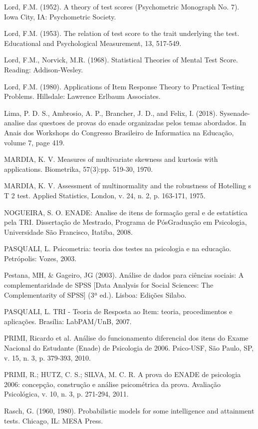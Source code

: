 \documentclass[12pt]{article}
\begin{document}
Lord, F.M. (1952). A theory of test scores (Psychometric Monograph No. 7). Iowa City, IA: Psychometric Society.

Lord, F.M. (1953). The relation of test score to the trait underlying the test. Educational and Psychological Measurement, 13, 517-549.

Lord, F.M., Norvick, M.R. (1968). Statistical Theories of Mental Test Score. Reading: Addison-Wesley.

Lord, F.M. (1980). Applications of Item Response Theory to Practical Testing Problems. Hillsdale: Lawrence Erlbaum Associates.

Lima, P. D. S., Ambrosio, A. P., Brancher, J. D., and Felix, I. (2018). Sysenade-analise
das questoes de provas do enade organizadas pelos temas abordados. In Anais dos
Workshops do Congresso Brasileiro de Informatica na Educação, volume 7, page 419.

MARDIA, K. V. Measures of multivariate skewness and kurtosis with applications. Biometrika, 57(3):pp. 519-30, 1970.

MARDIA, K. V. Assessment of multinormality and the robustness of Hotelling s T 2 test. Applied Statistics, London, v. 24, n. 2, p. 163-171, 1975.

NOGUEIRA, S. O. ENADE: Analise de itens de formação geral e de estatística pela TRI. Dissertação de Mestrado, Programa de PósGraduação em Psicologia, Universidade São Francisco, Itatiba, 2008.

PASQUALI, L. Psicometria: teoria dos testes na psicologia e na educação. Petrópolis: Vozes, 2003.

Pestana, MH, \& Gageiro, JG (2003). Análise de dados para ciências sociais: A complementaridade de SPSS [Data Analysis for Social Sciences: The Complementarity of SPSS] (3ª ed.). Lisboa: Edições Silabo.

PASQUALI, L. TRI - Teoria de Resposta ao Item: teoria, procedimentos e aplicações. Brasília: LabPAM/UnB, 2007.

PRIMI, Ricardo et al. Análise do funcionamento diferencial dos itens do Exame Nacional do Estudante (Enade) de Psicologia de 2006. Psico-USF, São Paulo, SP, v. 15, n. 3, p. 379-393, 2010. 

PRIMI, R.; HUTZ, C. S.; SILVA, M. C. R. A prova do ENADE de psicologia 2006: concepção, construção e análise psicométrica da prova. Avaliação Psicológica, v. 10, n. 3, p. 271-294, 2011.

Rasch, G. (1960, 1980). Probabilistic models for some intelligence and attainment tests. Chicago, IL: MESA Press.
\end{document}
